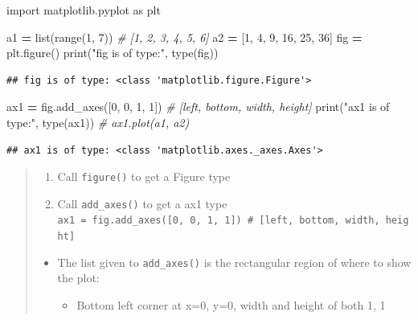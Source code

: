 \documentclass[
]{book}
\newenvironment{Shaded}{\begin{snugshade}}{\end{snugshade}}
\newcommand{\BuiltInTok}[1]{#1}
\newcommand{\CommentTok}[1]{\textcolor[rgb]{0.56,0.35,0.01}{\textit{#1}}}
\newcommand{\DecValTok}[1]{\textcolor[rgb]{0.00,0.00,0.81}{#1}}
\newcommand{\ImportTok}[1]{#1}
\newcommand{\NormalTok}[1]{#1}
\newcommand{\OperatorTok}[1]{\textcolor[rgb]{0.81,0.36,0.00}{\textbf{#1}}}
\newcommand{\StringTok}[1]{\textcolor[rgb]{0.31,0.60,0.02}{#1}}
\providecommand{\tightlist}{%
  \setlength{\itemsep}{0pt}\setlength{\parskip}{0pt}}
\theoremstyle{definition}
\theoremstyle{definition}
\theoremstyle{definition}
\theoremstyle{definition}
\theoremstyle{remark}
\begin{document}
\begin{Shaded}
\begin{Highlighting}[]
\ImportTok{import}\NormalTok{ matplotlib.pyplot }\ImportTok{as}\NormalTok{ plt}

\NormalTok{a1 }\OperatorTok{=} \BuiltInTok{list}\NormalTok{(}\BuiltInTok{range}\NormalTok{(}\DecValTok{1}\NormalTok{, }\DecValTok{7}\NormalTok{)) }\CommentTok{\# [1, 2, 3, 4, 5, 6]}
\NormalTok{a2 }\OperatorTok{=}\NormalTok{ [}\DecValTok{1}\NormalTok{, }\DecValTok{4}\NormalTok{, }\DecValTok{9}\NormalTok{, }\DecValTok{16}\NormalTok{, }\DecValTok{25}\NormalTok{, }\DecValTok{36}\NormalTok{]}
\NormalTok{fig }\OperatorTok{=}\NormalTok{ plt.figure()}
\BuiltInTok{print}\NormalTok{(}\StringTok{"fig is of type:"}\NormalTok{, }\BuiltInTok{type}\NormalTok{(fig))}
\end{Highlighting}
\end{Shaded}

\begin{verbatim}
## fig is of type: <class 'matplotlib.figure.Figure'>
\end{verbatim}

\begin{Shaded}
\begin{Highlighting}[]
\NormalTok{ax1 }\OperatorTok{=}\NormalTok{ fig.add\_axes([}\DecValTok{0}\NormalTok{, }\DecValTok{0}\NormalTok{, }\DecValTok{1}\NormalTok{, }\DecValTok{1}\NormalTok{]) }\CommentTok{\# [left, bottom, width, height]}
\BuiltInTok{print}\NormalTok{(}\StringTok{"ax1 is of type:"}\NormalTok{, }\BuiltInTok{type}\NormalTok{(ax1))}
\CommentTok{\# ax1.plot(a1, a2)}
\end{Highlighting}
\end{Shaded}

\begin{verbatim}
## ax1 is of type: <class 'matplotlib.axes._axes.Axes'>
\end{verbatim}

\begin{quote}
\begin{enumerate}
\def\labelenumi{\arabic{enumi}.}
\tightlist
\item
  Call \texttt{figure()} to get a Figure type
\item
  Call \texttt{add\_axes()} to get a ax1 type
  \texttt{ax1\ =\ fig.add\_axes({[}0,\ 0,\ 1,\ 1{]})\ \#\ {[}left,\ bottom,\ width,\ height{]}}
\end{enumerate}

\begin{itemize}
\tightlist
\item
  The list given to \texttt{add\_axes()} is the rectangular region of where to show the plot:

  \begin{itemize}
  \tightlist
  \item
    Bottom left corner at x=0, y=0, width and height of both 1, 1
  \end{itemize}
\end{itemize}
\end{quote}
\end{document}

